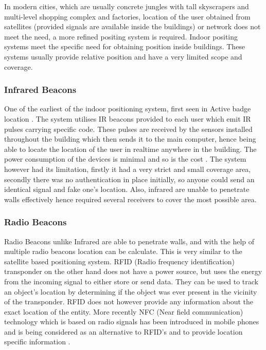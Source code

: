 \documentclass[12pt]{report}
\begin{document}
In modern cities, which are usually concrete jungles with tall skyscrapers and multi-level shopping complex and factories, location of the user obtained from satellites (provided signals are available inside the buildings) or network does not meet the need, a more refined positing system is required.  Indoor positing systems meet the specific need for obtaining position inside buildings. These systems usually provide relative position and have a very limited scope and coverage. 


\subsubsection{Infrared Beacons}
One of the earliest of the indoor positioning system, first seen in Active badge location \cite{want1992active}. The system utilises IR beacons provided to each user which emit IR pulses carrying specific code. These pulses are received by the sensors installed throughout the building which then sends it to the main computer, hence being able to locate the location of the user in realtime anywhere in the building. The power consumption of the devices is minimal and so is the cost \cite{schiller2004location}. The system however had its limitation, firstly it had a very strict and small coverage area, secondly there was no authentication in place initially, so anyone could send an identical signal and fake one's location. Also, infrared are unable to penetrate walls effectively hence required several receivers to cover the most possible area.


\subsubsection{Radio Beacons}
Radio Beacons unlike Infrared are able to penetrate walls, and with the help of multiple radio beacons location can be calculate. This is very similar to the satellite based positioning system. RFID (Radio frequency identification) transponder on the other hand does not have a power source, but uses the energy from the incoming signal to either store or send data. They can be used to track an object's location by determining if the object was ever present in the vicinity of the transponder. RFID does not however provide any information about the exact location of the entity. More recently NFC (Near field communication) technology which is based on radio signals has been introduced in mobile phones and is being considered as an alternative to RFID's and to provide location specific information \cite{siira2009location}.
\end{document}
